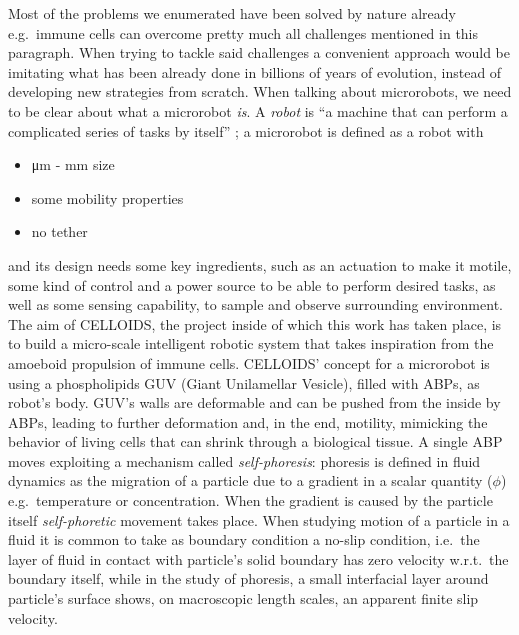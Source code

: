 \documentclass[../../master_thesis_np.tex]{subfiles}
\begin{document}
	Most of the problems we enumerated have been solved by nature already e.g.\ immune cells can overcome pretty much all challenges mentioned in this paragraph. 
	When trying to tackle said challenges a convenient approach would be imitating what has been already done in billions of years of evolution, instead of developing new strategies from scratch. \cite{palagi_bioinspired_2018}
	When talking about microrobots, we need to be clear about what a microrobot \emph{is}. 
	A \emph{robot} is \enquote{a machine that can perform a complicated series of tasks by itself} \cite{robot_def_oxf}; a microrobot is defined as a robot with
	\begin{itemize}
	\item \unit{\um} - \unit{\mm} size
	\item some mobility properties
	\item no tether
	\end{itemize}
	and its design needs some key ingredients, such as an actuation to make it motile, some kind of control and a power source to be able to perform desired tasks, as well as some sensing capability, to sample and observe surrounding environment. 
	The aim of CELLOIDS, the project inside of which this work has taken place, is to build a micro-scale intelligent robotic system that takes inspiration from the amoeboid propulsion of immune cells. 
	CELLOIDS’ concept for a microrobot is using a phospholipids GUV (Giant Unilamellar Vesicle), filled with ABPs, as robot's body. 
	GUV’s walls are deformable and can be pushed from the inside by ABPs, leading to further deformation and, in the end, motility, mimicking the behavior of living cells that can shrink through a biological tissue.
	A single ABP moves exploiting a mechanism called \emph{self-phoresis}: phoresis is defined in fluid dynamics as the migration of a particle due to a gradient in a scalar quantity ($\phi$) e.g.\ temperature or concentration. 
	When the gradient is caused by the particle itself \emph{self-phoretic} movement takes place. 
	When studying motion of a particle in a fluid it is common to take as boundary condition a no-slip condition, i.e.\ the layer of fluid in contact with particle's solid boundary has zero velocity w.r.t.\ the boundary itself, while in the study of phoresis, a small interfacial layer around particle's surface shows, on macroscopic length scales, an apparent finite slip velocity. 
\end{document}
